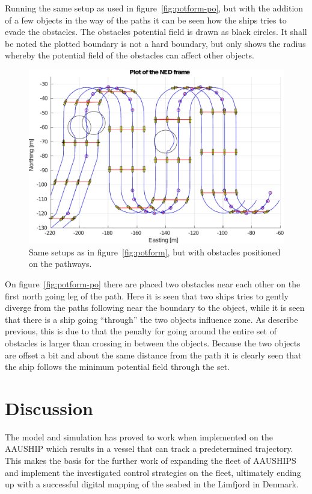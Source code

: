 \documentclass[a4paper,conference]{IEEEtran}
\begin{document}
Running the same setup as used in figure~\vref{fig:potform-po}, but with the addition of a few objects in the way of the paths it can be seen how the ships tries to evade the obstacles. The obstacles potential field is drawn as black circles. It shall be noted the plotted boundary is not a hard boundary, but only shows the radius whereby the potential field of the obstacles can affect other objects.
\begin{figure}[htbp]
  \centering
  \includegraphics[width=\linewidth]{fig/lawn-bar-formation-po}
  \caption{Same setups as in figure~\vref{fig:potform}, but with obstacles positioned on the pathways.}
  \label{fig:potform-po}
\end{figure}
On figure~\vref{fig:potform-po} there are placed two obstacles near each other on the first north going leg of the path. Here it is seen that two ships tries to gently diverge from the paths following near the boundary to the object, while it is seen that there is a ship going ``through'' the two objects influence zone. As describe previous, this is due to that the penalty for going around the entire set of obstacles is larger than crossing in between the objects. Because the two objects are offset a bit and about the same distance from the path it is clearly seen that the ship follows the minimum potential field through the set. 

\section{Discussion}

The model and simulation has proved to work when implemented on the AAUSHIP which results in a vessel that can track a predetermined trajectory. This makes the basis for the further work of expanding the fleet of AAUSHIPS and implement the investigated control strategies on the fleet, ultimately ending up with a successful digital mapping of the seabed in the Limfjord in Denmark.
\end{document}
